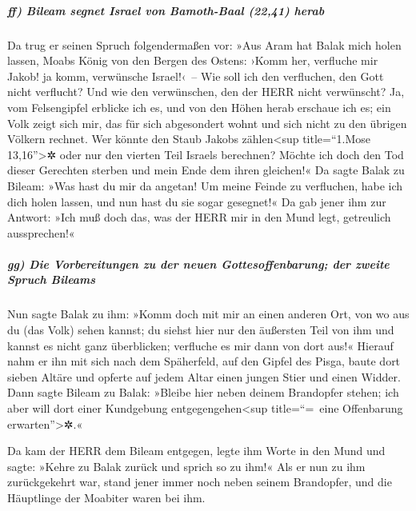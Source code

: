 \hypertarget{ff-bileam-segnet-israel-von-bamoth-baal-2241-herab}{%
\subparagraph{ff) Bileam segnet Israel von Bamoth-Baal (22,41)
herab}\label{ff-bileam-segnet-israel-von-bamoth-baal-2241-herab}}

Da trug er seinen Spruch folgendermaßen vor: »Aus Aram hat
Balak mich holen lassen, Moabs König von den Bergen des Ostens: ›Komm
her, verfluche mir Jakob! ja komm, verwünsche Israel!‹~--
Wie soll ich den verfluchen, den Gott nicht verflucht? Und
wie den verwünschen, den der HERR nicht verwünscht? Ja,
vom Felsengipfel erblicke ich es, und von den Höhen herab erschaue ich
es; ein Volk zeigt sich mir, das für sich abgesondert wohnt und sich
nicht zu den übrigen Völkern rechnet. Wer könnte den
Staub Jakobs zählen\textless sup title=``1.Mose 13,16''\textgreater✲
oder nur den vierten Teil Israels berechnen? Möchte ich doch den Tod
dieser Gerechten sterben und mein Ende dem ihren gleichen!«
Da sagte Balak zu Bileam: »Was hast du mir da angetan! Um
meine Feinde zu verfluchen, habe ich dich holen lassen, und nun hast du
sie sogar gesegnet!« Da gab jener ihm zur Antwort: »Ich
muß doch das, was der HERR mir in den Mund legt, getreulich
aussprechen!«

\hypertarget{gg-die-vorbereitungen-zu-der-neuen-gottesoffenbarung-der-zweite-spruch-bileams}{%
\subparagraph{gg) Die Vorbereitungen zu der neuen Gottesoffenbarung; der
zweite Spruch
Bileams}\label{gg-die-vorbereitungen-zu-der-neuen-gottesoffenbarung-der-zweite-spruch-bileams}}

Nun sagte Balak zu ihm: »Komm doch mit mir an einen
anderen Ort, von wo aus du (das Volk) sehen kannst; du siehst hier nur
den äußersten Teil von ihm und kannst es nicht ganz überblicken;
verfluche es mir dann von dort aus!« Hierauf nahm er ihn
mit sich nach dem Späherfeld, auf den Gipfel des Pisga, baute dort
sieben Altäre und opferte auf jedem Altar einen jungen Stier und einen
Widder. Dann sagte Bileam zu Balak: »Bleibe hier neben
deinem Brandopfer stehen; ich aber will dort einer Kundgebung
entgegengehen\textless sup title=``=~eine Offenbarung
erwarten''\textgreater✲.«

Da kam der HERR dem Bileam entgegen, legte ihm Worte in
den Mund und sagte: »Kehre zu Balak zurück und sprich so zu ihm!«
Als er nun zu ihm zurückgekehrt war, stand jener immer
noch neben seinem Brandopfer, und die Häuptlinge der Moabiter waren bei
ihm.

